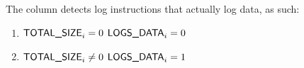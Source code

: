 The \logLogsData{} column detects log instructions that actually log data, as such:
\begin{enumerate}
	\item \If $\textsf{TOTAL\_SIZE}_{i} =    0$ \Then $\textsf{LOGS\_DATA}_{i} = 0$
	\item \If $\textsf{TOTAL\_SIZE}_{i} \neq 0$ \Then $\textsf{LOGS\_DATA}_{i} = 1$
\end{enumerate}
